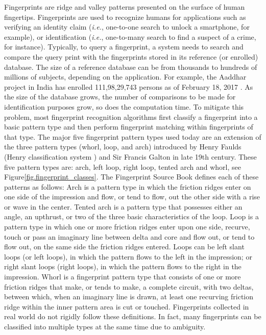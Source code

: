 

Fingerprints are ridge and valley patterns presented on the surface of human fingertips.
%
Fingerprints are used to recognize humans for applications such as verifying an identity claim (\textit{i.e.}, one-to-one search to  unlock a smartphone, for example), or identification (\textit{i.e.}, one-to-many search to find a suspect of a crime, for instance).
%
Typically, to query a fingerprint, a system needs to search and compare the query print with the fingerprints stored in its reference (or enrolled) database.  The size of a reference database can be from thousands to hundreds of millions of subjects, depending on the application. For example, the Aaddhar project in India has enrolled 111,98,29,743 persons as of February 18, 2017 \cite{aaddhaar}.  
%
As the size of the database grows, the number of comparisons to be made for identification purposes grow, so does the computation time.
%
To mitigate this problem, most fingerprint recognition algorithms first classify a fingerprint into a basic pattern type and then perform fingerprint matching within fingerprints of that type.
%
The major five fingerprint pattern types used today are an extension of the three pattern types (whorl, loop, and arch) introduced by Henry Faulds (Henry classification system \cite{henry1905classification}) and Sir Francis Galton \cite{galton1892} in late 19th century. These five pattern types are: arch, left loop, right loop, tented arch and whorl, see Figure\ref{fig.fingerprint_classes}.  
%
The Fingerprint Source Book \cite{nijSourceBook} defines each of these patterns as follows: 
%
Arch is a pattern type in which the friction ridges enter on one side of the impression and flow, or tend to flow, out the other side with a rise or wave in the center. 
%
Tented arch is a pattern type that possesses either an angle, an upthrust, or two of the three basic characteristics of the loop. 
%
Loop is a pattern type in which one or more friction ridges enter upon one side, recurve, touch or pass an imaginary line between delta and core and flow out, or tend to flow out, on the same side the friction ridges entered. Loops can be left slant loops (or left loops), in which the pattern flows to the left in the impression; or right slant loops (right loops), in which the pattern flows to the right in the impression.
%
Whorl is a fingerprint pattern type that consists of one or more friction ridges that make, or tends to make, a complete circuit, with two deltas, between which, when an imaginary line is drawn, at least one recurving friction ridge within the inner pattern area is cut or touched. 
{\color{red}
Fingerprints collected in real world do not rigidly follow these definitions.
In fact, many fingerprints can be classified into multiple types at the same time due to ambiguity.
}

